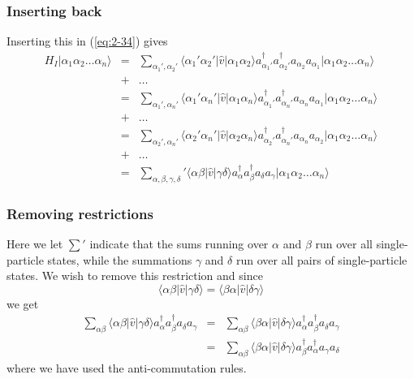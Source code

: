 \documentclass{beamer}
\begin{document}
\begin{frame}
\frametitle{Inserting back}

Inserting this in (\ref{eq:2-34}) gives
\begin{align}
	H_I |\alpha_1\alpha_2\dots\alpha_n\rangle
	&=& \sum_{\alpha_1', \alpha_2'} \langle \alpha_1'\alpha_2'|\hat{v}|\alpha_1\alpha_2\rangle
		a_{\alpha_1'}^{\dagger} a_{\alpha_2'}^{\dagger} a_{\alpha_2} a_{\alpha_1}
		|\alpha_1\alpha_2\dots\alpha_n\rangle \nonumber \\
	&+& \dots \nonumber \\
	&=& \sum_{\alpha_1', \alpha_n'} \langle \alpha_1'\alpha_n'|\hat{v}|\alpha_1\alpha_n\rangle
		a_{\alpha_1'}^{\dagger} a_{\alpha_n'}^{\dagger} a_{\alpha_n} a_{\alpha_1}
		|\alpha_1\alpha_2\dots\alpha_n\rangle \nonumber \\
	&+& \dots \nonumber \\
	&=& \sum_{\alpha_2', \alpha_n'} \langle \alpha_2'\alpha_n'|\hat{v}|\alpha_2\alpha_n\rangle
		a_{\alpha_2'}^{\dagger} a_{\alpha_n'}^{\dagger} a_{\alpha_n} a_{\alpha_2}
		|\alpha_1\alpha_2\dots\alpha_n\rangle \nonumber \\
	&+& \dots \nonumber \\
	&=& \sum_{\alpha, \beta, \gamma, \delta} ' \langle \alpha\beta|\hat{v}|\gamma\delta\rangle
		a^{\dagger}_\alpha a^{\dagger}_\beta a_\delta a_\gamma
		|\alpha_1\alpha_2\dots\alpha_n\rangle \label{eq:2-36}
\end{align}
\end{frame}

\begin{frame}
\frametitle{Removing restrictions}

Here we let $\sum'$ indicate that the sums running over $\alpha$ and $\beta$ run over all
single-particle states, while the summations  $\gamma$ and $\delta$ 
run over all pairs of single-particle states. We wish to remove this restriction and since
\begin{equation}
	\langle \alpha\beta|\hat{v}|\gamma\delta\rangle = \langle \beta\alpha|\hat{v}|\delta\gamma\rangle \label{eq:2-37}
\end{equation}
we get
\begin{align}
	\sum_{\alpha\beta} \langle \alpha\beta|\hat{v}|\gamma\delta\rangle a^{\dagger}_\alpha a^{\dagger}_\beta a_\delta a_\gamma &=& 
		\sum_{\alpha\beta} \langle \beta\alpha|\hat{v}|\delta\gamma\rangle 
		a^{\dagger}_\alpha a^{\dagger}_\beta a_\delta a_\gamma \label{eq:2-38a} \\
	&=& \sum_{\alpha\beta}\langle \beta\alpha|\hat{v}|\delta\gamma\rangle
		a^{\dagger}_\beta a^{\dagger}_\alpha a_\gamma a_\delta \label{eq:2-38b}
\end{align}
where we  have used the anti-commutation rules.
\end{frame}
\end{document}
